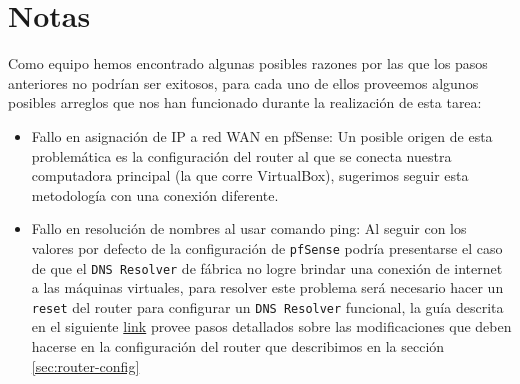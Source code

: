 \documentclass{article}
\begin{document}
    \section{Notas}

        Como equipo hemos encontrado algunas posibles razones por las que los pasos anteriores no podrían ser exitosos, para cada uno de ellos proveemos algunos posibles arreglos que nos han funcionado durante la realización de esta tarea:
        \begin{itemize}
            \item Fallo en asignación de IP a red WAN en pfSense: Un posible origen de esta problemática es la configuración del router al que se conecta nuestra computadora principal (la que corre VirtualBox), sugerimos seguir esta metodología con una conexión diferente.
            \item Fallo en resolución de nombres al usar comando ping: Al seguir con los valores por defecto de la configuración de \texttt{pfSense} podría presentarse el caso de que el \texttt{DNS Resolver} de fábrica no logre brindar una conexión de internet a las máquinas virtuales, para resolver este problema será necesario hacer un \texttt{reset} del router para configurar un \texttt{DNS Resolver} funcional, la guía descrita en el siguiente \href{https://coygeek.com/docs/pfsense-virtualbox/}{link} provee pasos detallados sobre las modificaciones que deben hacerse en la configuración del router que describimos en la sección \ref{sec:router-config}
        \end{itemize}
    
    \clearpage
    
    
\end{document}
